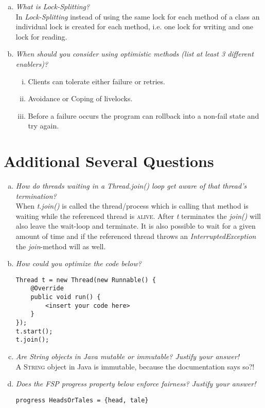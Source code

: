 \documentclass{report}
\begin{document}
\begin{enumerate}[a)]
			\item \textit{What is Lock-Splitting?} \\
			In \textit{Lock-Splitting} instead of using the same lock for each method of a class an individual lock is created for each method, i.e. one lock for writing and one lock for reading.
			\item \textit{When should you consider using optimistic methods (list at least 3 different enablers)?}
			\begin{enumerate}[(i)]
				\item Clients can tolerate either failure or retries.
				\item Avoidance or Coping of livelocks.
				\item Before a failure occurs the program can rollback into a non-fail state and try again.
			\end{enumerate}
		\end{enumerate}
	\closesection
	\setcounter{section}{2}
	\section{Additional Several Questions}
	\startsection
		\begin{enumerate}[a)]
			\item \textit{How do threads waiting in a Thread.join() loop get aware of that thread’s termination?} \\
			When \textit{t.join()} is called the thread/process which is calling that method is waiting while the referenced thread is \textsc{alive}. After \textit{t} terminates the \textit{join()} will also leave the wait-loop and terminate. It is also possible to wait for a given amount of time and if the referenced thread throws an \textit{InterruptedException} the \textit{join}-method will as well.
			\item \textit{How could you optimize the code below?}
			\begin{verbatim}
Thread t = new Thread(new Runnable() {
	@Override
	public void run() {
		<insert your code here>
	}
});
t.start();
t.join();
			\end{verbatim}
			\item \textit{Are String objects in Java mutable or immutable? Justify your answer!} \\
			A \textsc{String} object in Java is immutable, because the documentation says so?!
			\item \textit{Does the FSP progress property below enforce fairness? Justify your answer!}
			\begin{verbatim}
progress HeadsOrTales = {head, tale}
			\end{verbatim}
		\end{enumerate}
	\closesection
\end{document}
